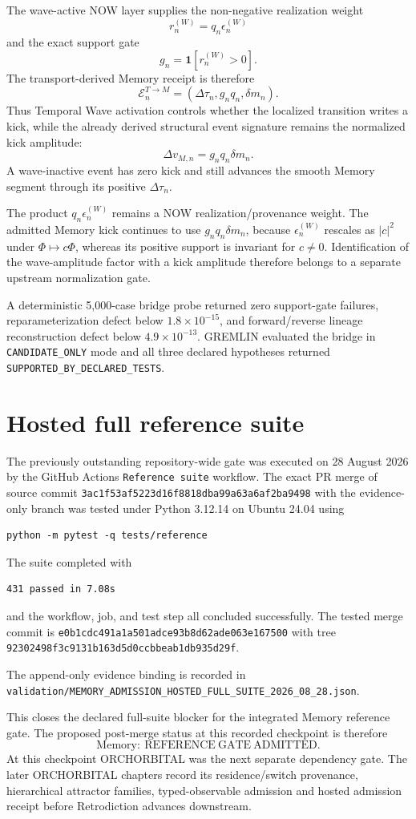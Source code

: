 The wave-active NOW layer supplies the non-negative realization weight
\[
r_n^{(W)}=q_n\epsilon_n^{(W)}
\]
and the exact support gate
\[
g_n=\mathbf 1[r_n^{(W)}>0].
\]
The transport-derived Memory receipt is therefore
\[
\boxed{
\mathcal E_n^{T\to M}
=(\Delta\tau_n,g_nq_n,\delta m_n).
}
\]
Thus Temporal Wave activation controls whether the localized transition writes a kick, while the already derived structural event signature remains the normalized kick amplitude:
\[
\boxed{
\Delta v_{M,n}=g_nq_n\delta m_n.
}
\]
A wave-inactive event has zero kick and still advances the smooth Memory segment through its positive \(\Delta\tau_n\).

The product \(q_n\epsilon_n^{(W)}\) remains a NOW realization/provenance weight. The admitted Memory kick continues to use \(g_nq_n\delta m_n\), because \(\epsilon_n^{(W)}\) rescales as \(|c|^2\) under \(\Phi\mapsto c\Phi\), whereas its positive support is invariant for \(c\neq0\). Identification of the wave-amplitude factor with a kick amplitude therefore belongs to a separate upstream normalization gate.

A deterministic 5,000-case bridge probe returned zero support-gate failures, reparameterization defect below \(1.8\times10^{-15}\), and forward/reverse lineage reconstruction defect below \(4.9\times10^{-13}\). GREMLIN evaluated the bridge in \texttt{CANDIDATE\_ONLY} mode and all three declared hypotheses returned \texttt{SUPPORTED\_BY\_DECLARED\_TESTS}.

\section{Hosted full reference suite}

The previously outstanding repository-wide gate was executed on 28 August 2026 by the GitHub Actions \texttt{Reference suite} workflow. The exact PR merge of source commit
\texttt{3ac1f53af5223d16f8818dba99a63a6af2ba9498}
with the evidence-only branch was tested under Python 3.12.14 on Ubuntu 24.04 using
\begin{verbatim}
python -m pytest -q tests/reference
\end{verbatim}
The suite completed with
\begin{verbatim}
431 passed in 7.08s
\end{verbatim}
and the workflow, job, and test step all concluded successfully. The tested merge commit is
\texttt{e0b1cdc491a1a501adce93b8d62ade063e167500}
with tree
\texttt{92302498f3c9131b163d5d0ccbbeab1db935d29f}.

The append-only evidence binding is recorded in
\texttt{validation/MEMORY\_ADMISSION\_HOSTED\_FULL\_SUITE\_2026\_08\_28.json}.

This closes the declared full-suite blocker for the integrated Memory reference gate. The proposed post-merge status at this recorded checkpoint is therefore
\[
\boxed{\mathrm{Memory}:\ \mathrm{REFERENCE\ GATE\ ADMITTED}.}
\]
At this checkpoint ORCHORBITAL was the next separate dependency gate. The later ORCHORBITAL chapters record its residence/switch provenance, hierarchical attractor families, typed-observable admission and hosted admission receipt before Retrodiction advances downstream.
